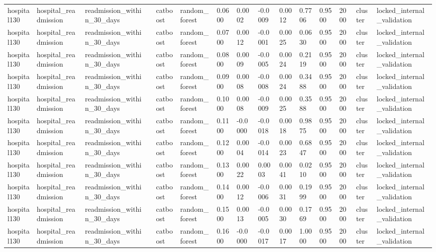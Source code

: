 \begin{tabular}{lllllllllllllll}
hospital130 & hospital\_readmission & readmission\_within\_30\_days &  & catboost & random\_forest & 0.0600 & 0.0002 & -0.0009 & 0.0012 & 0.7706 & 0.9500 & 2000 & cluster & locked\_internal\_validation \\
hospital130 & hospital\_readmission & readmission\_within\_30\_days &  & catboost & random\_forest & 0.0700 & 0.0012 & -0.0001 & 0.0025 & 0.0630 & 0.9500 & 2000 & cluster & locked\_internal\_validation \\
hospital130 & hospital\_readmission & readmission\_within\_30\_days &  & catboost & random\_forest & 0.0800 & 0.0009 & -0.0005 & 0.0024 & 0.2119 & 0.9500 & 2000 & cluster & locked\_internal\_validation \\
hospital130 & hospital\_readmission & readmission\_within\_30\_days &  & catboost & random\_forest & 0.0900 & 0.0008 & -0.0008 & 0.0024 & 0.3488 & 0.9500 & 2000 & cluster & locked\_internal\_validation \\
hospital130 & hospital\_readmission & readmission\_within\_30\_days &  & catboost & random\_forest & 0.1000 & 0.0008 & -0.0009 & 0.0025 & 0.3588 & 0.9500 & 2000 & cluster & locked\_internal\_validation \\
hospital130 & hospital\_readmission & readmission\_within\_30\_days &  & catboost & random\_forest & 0.1100 & -0.0000 & -0.0018 & 0.0018 & 0.9875 & 0.9500 & 2000 & cluster & locked\_internal\_validation \\
hospital130 & hospital\_readmission & readmission\_within\_30\_days &  & catboost & random\_forest & 0.1200 & 0.0004 & -0.0014 & 0.0023 & 0.6847 & 0.9500 & 2000 & cluster & locked\_internal\_validation \\
hospital130 & hospital\_readmission & readmission\_within\_30\_days &  & catboost & random\_forest & 0.1300 & 0.0022 & 0.0003 & 0.0041 & 0.0210 & 0.9500 & 2000 & cluster & locked\_internal\_validation \\
hospital130 & hospital\_readmission & readmission\_within\_30\_days &  & catboost & random\_forest & 0.1400 & 0.0012 & -0.0006 & 0.0031 & 0.1999 & 0.9500 & 2000 & cluster & locked\_internal\_validation \\
hospital130 & hospital\_readmission & readmission\_within\_30\_days &  & catboost & random\_forest & 0.1500 & 0.0013 & -0.0005 & 0.0030 & 0.1769 & 0.9500 & 2000 & cluster & locked\_internal\_validation \\
hospital130 & hospital\_readmission & readmission\_within\_30\_days &  & catboost & random\_forest & 0.1600 & -0.0000 & -0.0017 & 0.0017 & 1.0000 & 0.9500 & 2000 & cluster & locked\_internal\_validation \\

\end{tabular}
